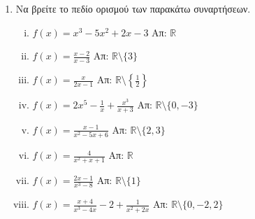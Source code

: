 



\everymath{\displaystyle}

\thispagestyle{empty}




\begin{center}
\end{center}

\vspace{\baselineskip}


\begin{enumerate}
    \item  Να βρείτε το πεδίο ορισμού των παρακάτω συναρτήσεων.
        \begin{enumerate}[i)]
            \item $ f(x) = x^{3} - 5x^{2} + 2x -3 $ \hfill Απ: $ \mathbb{R} $
            \item $ f(x) = \frac{x-2}{x-3} $ \hfill Απ: $ \mathbb{R} \setminus 
                \{ 3 \} $ 
            \item $ f(x) = \frac{x}{2x-1} $ \hfill Απ: 
                $ \mathbb{R} \setminus \left\{ \frac{1}{2} \right\} $ 
            \item $ f(x) = 2x^{5} - \frac{1}{x} + \frac{x^{3}}{x+3}  $ \hfill 
                Απ: $ \mathbb{R} \setminus \{ 0, -3 \} $
            \item $ f(x) = \frac{x-1}{x^{2} - 5x + 6} $ \hfill Απ: 
                $ \mathbb{R} \setminus \{ 2,3 \}  $ 
            \item $ f(x) = \frac{4}{x^{2}+x+1} $ \hfill Απ: $ \mathbb{R} $ 
            \item $ f(x) = \frac{2x-1}{x^{3}-8} $ \hfill Απ: 
                $ \mathbb{R} \setminus \{ 1 \}  $ 
            \item $ f(x) = \frac{x+4}{x^{3}-4x} -2 + \frac{1}{x^{2}+2x} $ 
                \hfill Απ: $ \mathbb{R} \setminus \{ 0,-2,2 \} $ 
        \end{enumerate}


\end{enumerate}
